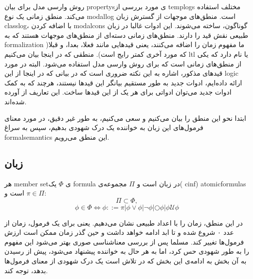 روش وارسی مدل برای بیان \glspl*{property}ی مورد بررسی از \glspl*{templog} مختلف استفاده می‌کند. منطق زمانی یک نوع \gls*{modallog} است. منطق‌های موجهات از گسترش زبان \gls*{classlog}، با اضافه کردن \glspl*{modalcon} گوناگون، ساخته می‌شوند. این ادوات غالبا در زبان طبیعی نقش قید را دارند. منطق‌های زمانی دسته‌ای از منطق‌های موجهات هستند که به \gls*{formalization} ما مفهوم زمان را اضافه می‌کنند، یعنی قیدهایی مانند فعلا، بعدا، و قبلا( که مورد آخری کمتر رایج است). منطقی که در اینجا بیان می‌کنیم \gls{ltl} یا  نام دارد که یکی از منطق‌های زمانی است که برای روش وارسی مدل استفاده می‌شود. البته در مورد قیدهای مذکور، اشاره به این نکته ضروری است که در بیانی که در اینجا از این \gls*{logic} ارائه داده‌ایم، ادوات جدید به‌ طور مستقیم بیانگر این قید‌ها نیستند، هرچند که به کمک ادوات جدید می‌توان ادواتی برای هر یک از این قیدها ساخت.
این تعاریف از \cite{buchi} آورده شده‌اند.

ابتدا نحو این منطق را بیان می‌کنیم و سعی می‌کنیم، به طور غیر دقیق، در مورد معنای فرمول‌های این زبان به خواننده یک درک شهودی بدهیم، سپس به سراغ \gls*{formalsemantics} این منطق می‌رویم.

\subsection{زبان }
\begin{defn}
	هر \gls*{member} \gls*{set}ی $\Phi$ یک \gls*{formula} در زبان  است و $\Pi$ مجموعه‌ی‌( \gls*{cinf}) \glspl*{atomicformula} است و $\pi \in \Pi$:
	$$
	\Pi \subset \Phi,
	$$
	$$
	\phi \in \Phi \Leftrightarrow
	\phi ::= \pi | \phi \lor \phi |
	\neg \phi |
	\bigcirc \phi |
	\phi \mathcal{U}\phi 
$$	
	
\end{defn}
در این منطق، زمان را با اعداد طبیعی نشان می‌دهیم. یعنی برای یک فرمول، زمان از عدد ۰ شروع شده و تا ابد ادامه خواهد داشت و حین گذر زمان ممکن است ارزش فرمول‌ها تغییر کند. مسلما پس از بررسی معناشناسی صوری بهتر می‌شود این مفهوم را به طور شهودی حس کرد، اما به هر حال به خواننده پیشنهاد می‌شود، پیش از رسیدن به آن بخش به ادامه‌ی این بخش که در تلاش است یک درک شهودی از معنای فرمول‌ها بدهد، توجه کند. 

